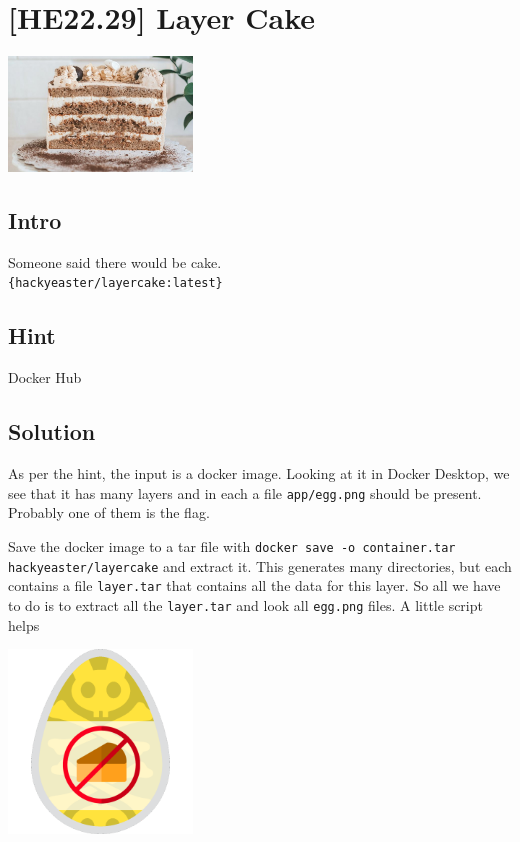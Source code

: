 
\hypertarget{he22.29}{%
\chapter{[HE22.29] Layer Cake}\label{he22.29}}

\begin{marginfigure}
	\includegraphics[width=49mm]{level7/challenge29.jpg}
\end{marginfigure}
\section{Intro}
Someone said there would be cake.\\
\noindent\verb+{hackyeaster/layercake:latest}+


\section{Hint}
Docker Hub

\section{Solution}\label{hv22.29solution}

As per the hint, the input is a docker image.  Looking at it in Docker Desktop,
we see that it has many layers and in each a file
\texttt{app/egg.png} should be present.  Probably one of them is the flag.

Save the docker image to a tar file with 
\texttt{docker save -o container.tar hackyeaster/layercake} and extract it.  This
generates many directories, but each contains a file \verb+layer.tar+ that
contains all the data for this layer.  So all we have to do is to extract all
the \verb+layer.tar+ and look all \verb+egg.png+ files.  A little script helps

\begin{marginfigure}
	\includegraphics[width=49mm]{level7/egg_0.png}
\end{marginfigure}

